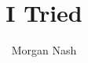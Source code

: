 \documentclass[a4paper,10pt]{article}
\title{I Tried}
\author{Morgan Nash}
\begin{document}
\maketitle



\medskip


\end{document}

